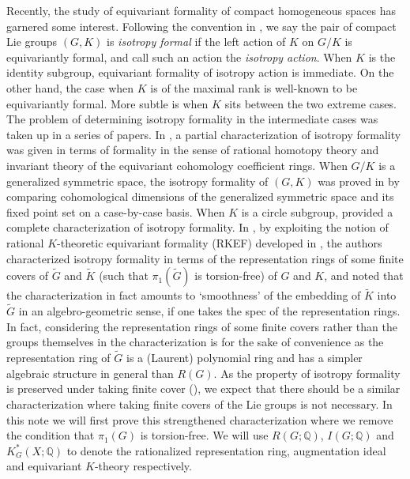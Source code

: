 \documentclass[11pt]{amsart}
\theoremstyle{plain}
\theoremstyle{definition}
\begin{document}
Recently, the study of equivariant formality of compact homogeneous spaces has garnered some interest. Following the convention in \cite{CFok}, we say the pair of compact Lie groups $(G, K)$ is \emph{isotropy formal} if the left action of $K$ on $G/K$ is equivariantly formal, and call such an action the \emph{isotropy action}. When $K$ is the identity subgroup, equivariant formality of isotropy action is immediate. On the other hand, the case when $K$ is of the maximal rank is well-known to be equivariantly formal. More subtle is when $K$ sits between the two extreme cases. The problem of determining isotropy formality in the intermediate cases was taken up in a series of papers. In \cite{ST, Sh}, a partial characterization of isotropy formality was given in terms of formality in the sense of rational homotopy theory and invariant theory of the equivariant cohomology coefficient rings. When $G/K$ is a generalized symmetric space, the isotropy formality of $(G, K)$ was proved in \cite{Go, GN} by comparing cohomological dimensions of the generalized symmetric space and its fixed point set on a case-by-case basis. When $K$ is a circle subgroup, \cite{Ca} provided a complete characterization of isotropy formality. In \cite{CFok}, by exploiting the notion of rational $K$-theoretic equivariant formality (RKEF) developed in \cite{F2}, the authors characterized isotropy formality in terms of the representation rings of some finite covers of $\widetilde{G}$ and $\widetilde{K}$ (such that $\pi_1(\widetilde{G})$ is torsion-free) of $G$ and $K$, and noted that the characterization in fact amounts to `smoothness' of the embedding of $\widetilde{K}$ into $\widetilde{G}$ in an algebro-geometric sense, if one takes the spec of the representation rings. In fact, considering the representation rings of some finite covers rather than the groups themselves in the characterization is for the sake of convenience as the representation ring of $\widetilde{G}$ is a (Laurent) polynomial ring and has a simpler algebraic structure in general than $R(G)$. As the property of isotropy formality is preserved under taking finite cover (\cite[Theorem 1.2]{Ca}), we expect that there should be a similar characterization where taking finite covers of the Lie groups is not necessary. In this note we will first prove this strengthened characterization where we remove the condition that $\pi_1(G)$ is torsion-free. %
We will use $R(G; \mathbb{Q})$, $I(G; \mathbb{Q})$ and $K^*_G(X; \mathbb{Q})$ to denote the rationalized representation ring, augmentation ideal and equivariant $K$-theory respectively. %
\end{document}
